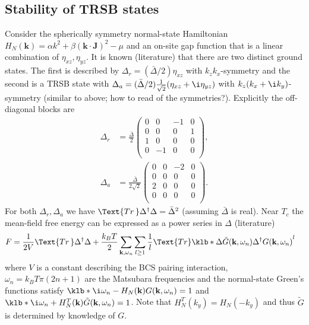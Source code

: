 \documentclass[english, parskip=full]{scrartcl}
\begin{document}
\subsection{Stability of TRSB states}
Consider the spherically symmetry normal-state Hamiltonian $H_N(\textbf{k}) = \alpha k^2 + \beta (\textbf{k} \cdot \textbf{J})^2 - \mu$ and an on-site gap function that is a linear combination of $\eta_{xz},\eta_{yz}$.
It is known (literature) that there are two distinct ground states.
The first is described by $\Delta_r=(\bar{\Delta}/2)\eta_{xz}$ with $k_zk_x$-symmetry and the second is a TRSB state with $\Delta_a = (\bar{\Delta}/2) \frac{1}{\sqrt{2}} (\eta_{xz} + \i \eta_{yz})$ with $k_z(k_x+\i k_y)$-symmetry (\color{red}similar to above; how to read of the symmetries?\color{black}).
Explicitly the off-diagonal blocks are
\begin{align}
\Delta_r &= \frac{\bar{\Delta}}{2} \begin{pmatrix} 0 & 0 & -1 & 0 \\ 0 & 0 & 0 & 1 \\ 1 & 0 & 0 & 0 \\ 0 & -1 & 0 & 0 \\  \end{pmatrix},\\
\Delta_a &= \frac{\bar{\Delta}}{2\sqrt{2}} \begin{pmatrix} 0 & 0 & -2 & 0 \\ 0 & 0 & 0 & 0 \\ 2 & 0 & 0 & 0 \\ 0 & 0 & 0 & 0 \\  \end{pmatrix}.
\end{align}
For both $\Delta_r,\Delta_a$ we have $\Text{Tr\,}\Delta^\dagger\Delta = \bar{\Delta}^2$ (assuming $\bar{\Delta}$ is real).
Near $T_c$ the mean-field free energy can be expressed as a power series in $\Delta$ (literature)
\begin{align}
F &= \frac{1}{2V} \Text{Tr\,}\Delta^\dagger\Delta + \frac{k_BT}{2} \sum_{\textbf{k},\omega_n} \sum_{l\ge 1} \frac{1}{l} \Text{Tr} \klb*{\Delta \tilde{G}(\textbf{k}, \omega_n) \Delta^\dagger G(\textbf{k},\omega_n)}^l
\end{align}
where $V$ is a constant describing the BCS pairing interaction, $\omega_n = k_BT\pi (2n+1)$ are the Matsubara frequencies and the normal-state Green's functions satisfy $\klb*{\i\omega_n - H_N(\textbf{k})} G(\textbf{k},\omega_n) = 1$ and $\klb*{\i\omega_n + H_N^T(\textbf{k})} \tilde{G}(\textbf{k},\omega_n) = 1$.
Note that $H_N^T(k_y) = H_N(-k_y)$ and thus $\tilde{G}$ is determined by knowledge of $G$.
\end{document}
